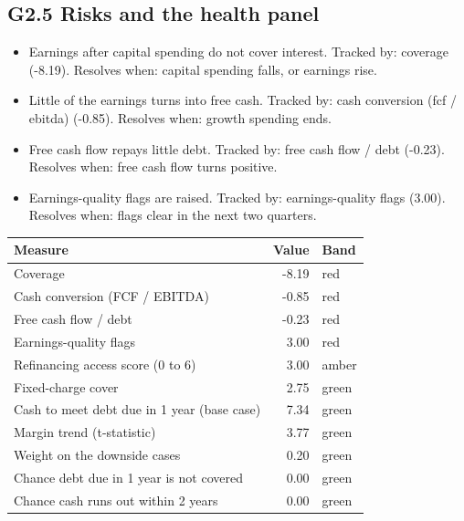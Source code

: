 \documentclass[11pt,a4paper]{article}
\begin{document}
\subsection*{G2.5 Risks and the health panel}
\begin{itemize}\item Earnings after capital spending do not cover interest. Tracked by: coverage (-8.19). Resolves when: capital spending falls, or earnings rise.\item Little of the earnings turns into free cash. Tracked by: cash conversion (fcf / ebitda) (-0.85). Resolves when: growth spending ends.\item Free cash flow repays little debt. Tracked by: free cash flow / debt (-0.23). Resolves when: free cash flow turns positive.\item Earnings-quality flags are raised. Tracked by: earnings-quality flags (3.00). Resolves when: flags clear in the next two quarters.\end{itemize}
\begin{center}\footnotesize\setlength{\tabcolsep}{3.5pt}\begin{tabular}{@{}lrl@{}}\toprule
Measure & Value & Band \\\midrule
Coverage & -8.19 & \textcolor{bad}{red} \\
Cash conversion (FCF / EBITDA) & -0.85 & \textcolor{bad}{red} \\
Free cash flow / debt & -0.23 & \textcolor{bad}{red} \\
Earnings-quality flags & 3.00 & \textcolor{bad}{red} \\
Refinancing access score (0 to 6) & 3.00 & \textcolor{amber}{amber} \\
Fixed-charge cover & 2.75 & \textcolor{good}{green} \\
Cash to meet debt due in 1 year (base case) & 7.34 & \textcolor{good}{green} \\
Margin trend (t-statistic) & 3.77 & \textcolor{good}{green} \\
Weight on the downside cases & 0.20 & \textcolor{good}{green} \\
Chance debt due in 1 year is not covered & 0.00 & \textcolor{good}{green} \\
Chance cash runs out within 2 years & 0.00 & \textcolor{good}{green} \\
\bottomrule\end{tabular}\end{center}
\end{document}
